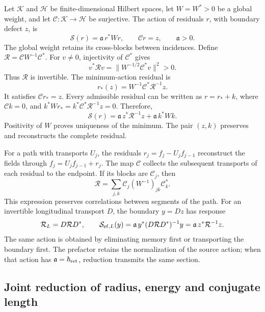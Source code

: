 Let \(\mathcal K\) and \(\mathcal H\) be finite-dimensional
Hilbert spaces, let \(W=W^*>0\) be a global weight, and let
\(\mathcal C:\mathcal K\to\mathcal H\) be surjective. The
action of residuals \(r\), with boundary defect \(z\), is
\[
 \mathcal S(r)=\mathfrak a\,r^*Wr,
 \qquad \mathcal Cr=z,\qquad \mathfrak a>0.
\]
The global weight retains its cross-blocks between incidences. Define
\(\mathcal R=\mathcal CW^{-1}\mathcal C^*\). For \(v\ne0\),
injectivity of \(\mathcal C^*\) gives
\[
 v^*\mathcal Rv=\|W^{-1/2}\mathcal C^*v\|^2>0.
\]
Thus \(\mathcal R\) is invertible. The minimum-action residual is
\[
 r_*(z)=W^{-1}\mathcal C^*\mathcal R^{-1}z.
\]
It satisfies \(\mathcal Cr_*=z\). Every admissible residual can
be written as \(r=r_*+k\), where \(\mathcal Ck=0\), and
\(k^*Wr_*=k^*\mathcal C^*\mathcal R^{-1}z=0\). Therefore,
\begin{equation}
 \mathcal S(r)=\mathfrak a\,z^*\mathcal R^{-1}z
             +\mathfrak a\,k^*Wk.
 \label{g26:eq:accion-residuo-en}
\end{equation}
Positivity of \(W\) proves uniqueness of the minimum. The pair
\((z,k)\) preserves and reconstructs the complete residual.

For a path with transports \(U_j\), the residuals
\(r_j=f_j-U_jf_{j-1}\) reconstruct the fields through
\(f_j=U_jf_{j-1}+r_j\). The map \(\mathcal C\) collects the
subsequent transports of each residual to the endpoint. If its
blocks are \(\mathcal C_j\), then
\[
 \mathcal R=\sum_{j,k}\mathcal C_j(W^{-1})_{jk}\mathcal C_k^*.
\]
This expression preserves correlations between segments of the path.
For an invertible longitudinal transport \(D\), the boundary
\(y=Dz\) has response
\[
 \mathcal R_L=D\mathcal RD^*,\qquad
 \mathcal S_{{\rm ef},L}(y)
 =\mathfrak a\,y^*(D\mathcal RD^*)^{-1}y
 =\mathfrak a\,z^*\mathcal R^{-1}z.
\]
The same action is obtained by eliminating memory first or transporting
the boundary first. The prefactor retains the normalization of the
source action; when that action has
\(\mathfrak a=\hbar_{\rm ret}\), reduction transmits the same section.

\subsection{Joint reduction of radius, energy and conjugate length}

